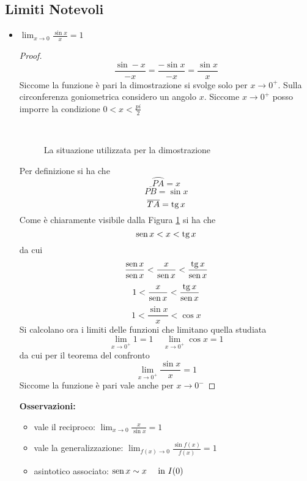 \documentclass{book}     %
\begin{document}
\subsection{Limiti Notevoli}
\begin{itemize}
\item {$\lim_{x\to 0}\frac{\sin x}{x}=1$}
\begin{proof}
    \[\frac{\sin -x}{-x}=\frac{-\sin x}{-x}=\frac{\sin x}{x}\]
    Siccome la funzione è pari la dimostrazione si svolge solo per $x\to 0^+$. Sulla circonferenza goniometrica considero un angolo $x$. Siccome $x \to 0^+$ posso imporre la condizione $0<x<\frac{pi}{2}$\\
    \begin{figure}[h]
        \centering
            \\
        \caption{La situazione utilizzata per la dimostrazione}
        \label{fig:sinx}
    \end{figure}
    Per definizione si ha che \[\wideparen{PA}=x\]\[\overline{PB}=\sin x\] \[\overline{TA}=\tg x\] 
    Come è chiaramente visibile dalla Figura \ref{fig:sinx} si ha che \[\sin x < x < \tg x\] da cui \[\frac{\sin x}{\sin x}<\frac{ x}{\sin x}<\frac{\tg x}{\sin x}\] \[1<\frac{ x}{\sin x}<\frac{\tg x}{\sin x}\] \[1<\frac{\sin x}{x}<\cos x\]
    Si calcolano ora i limiti delle funzioni che limitano quella studiata
    \[\lim_{x \to 0^+}1=1 ~~~~~ \lim_{x \to 0^+}\cos x=1\]
    da cui per il teorema del confronto \[\lim_{x\to 0^+} \frac{\sin x}{x}=1\] Siccome la funzione è pari vale anche per $x\to0^-$
\end{proof}
\textbf{Osservazioni:}
\begin{itemize}
    \item vale il reciproco: $\lim_{x\to 0}\frac{x}{\sin x}=1$
    \item vale la generalizzazione: $\lim_{f(x)\to 0}\frac{\sin f(x)}{f(x)}=1$
    \item asintotico associato: $\sin x \sim x ~~~~\textnormal{in } I(0)$

\end{itemize}
\end{itemize}
\end{document}
